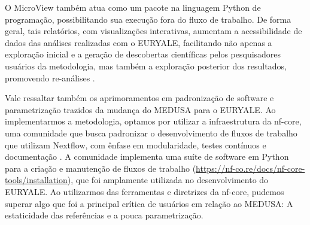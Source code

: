 \documentclass[
	12pt,				%
	oneside,			%
	a4paper,			%
	chapter=TITLE,		%
	section=TITLE,		%
	english,			%
	brazil				%
	]{abntex2}
\begin{document}
O MicroView também atua como um pacote na linguagem Python de programação, possibilitando sua execução fora do fluxo de trabalho. De forma geral, tais relatórios, com visualizações interativas, aumentam a acessibilidade de dados das análises realizadas com o EURYALE, facilitando não apenas a exploração inicial e a geração de descobertas científicas pelos pesquisadores usuários da metodologia, mas também a exploração posterior dos resultados, promovendo re-análises \autocite{perkel2018}.

Vale ressaltar também os aprimoramentos em padronização de software e parametrização trazidos da mudança do MEDUSA para o EURYALE. Ao implementarmos a metodologia, optamos por utilizar a infraestrutura da nf-core, uma comunidade que busca padronizar o desenvolvimento de fluxos de trabalho que utilizam Nextflow, com ênfase em modularidade, testes contínuos e documentação \autocite{ewels2020}. A comunidade implementa uma suíte de software em Python para a criação e manutenção de fluxos de trabalho (\url{https://nf-co.re/docs/nf-core-tools/installation}), que foi amplamente utilizada no desenvolvimento do EURYALE. Ao utilizarmos das ferramentas e diretrizes da nf-core, pudemos superar algo que foi a principal crítica de usuários em relação ao MEDUSA: A estaticidade das referências e a pouca parametrização.
\end{document}
